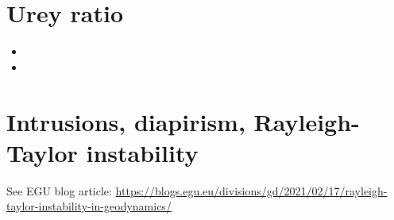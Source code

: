 \section{Urey ratio}

\begin{scriptsize}
\begin{itemize}
\item[\twothousandeight] 
\item[\twothousandtwelve] 
\end{itemize}
\end{scriptsize}

\section{Intrusions, diapirism, Rayleigh-Taylor instability}

See EGU blog article: 
\url{https://blogs.egu.eu/divisions/gd/2021/02/17/rayleigh-taylor-instability-in-geodynamics/}

